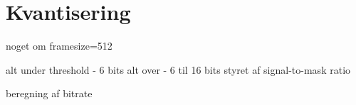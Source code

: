 \section{Kvantisering}
noget om framesize=512

alt under threshold - 6 bits
alt over - 6 til 16 bits styret af signal-to-mask ratio

beregning af bitrate
